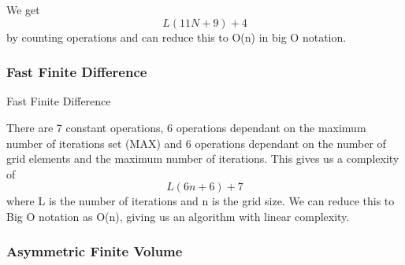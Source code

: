 \documentclass[aps,twocolumn,pre,nofootinbib,10pt]{revtex4-1}
\begin{document}
We get \[L(11N+9)+4\] by counting operations and can reduce this to O(n) in big O notation.

\subsubsection{Fast Finite Difference}
\begin{algorithm}
    \caption{Fast Finite Difference}
    \label{alg:ffd}
    \begin{algorithmic}[1]
                            \EndIf
                        \EndIf
                    \EndFor
                \EndFor
            \EndFor
        \EndFunction
    \end{algorithmic}
\end{algorithm}

There are 7 constant operations, 6 operations dependant on the maximum number of iterations set (MAX) and 6 operations dependant on the number of grid elements and the maximum number of iterations. This gives us a complexity of \[L(6n + 6) + 7\] where L is the number of iterations and n is the grid size. We can reduce this to Big O notation as O(n), giving us an algorithm with linear complexity.

\subsubsection{Asymmetric Finite Volume}
\end{document}
